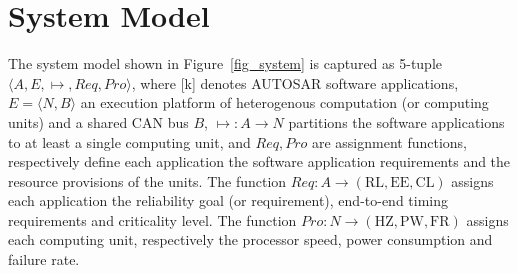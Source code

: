\section{System Model}\label{sec_system}
The system model shown in Figure~\ref{fig_system} is captured as 5-tuple $\langle A,E,\mapsto,Req,Pro\rangle$, where [k] denotes AUTOSAR software applications, $E=\langle N,B\rangle$ an execution platform of   heterogenous computation (or computing units) and a shared CAN bus $B$, $\mapsto: A\rightarrow N$ partitions the software applications to at least a single computing unit, and $Req, Pro$ are assignment functions, respectively define each application the software application requirements and the resource provisions of the units. The  function $Req:A\rightarrow (\mathrm{RL,EE,CL})$ assigns each application the reliability goal (or requirement), end-to-end timing requirements and criticality level. The function $Pro:N\rightarrow (\mathrm{HZ,PW,FR})$ assigns each computing unit, respectively the processor speed, power consumption and failure rate. 

